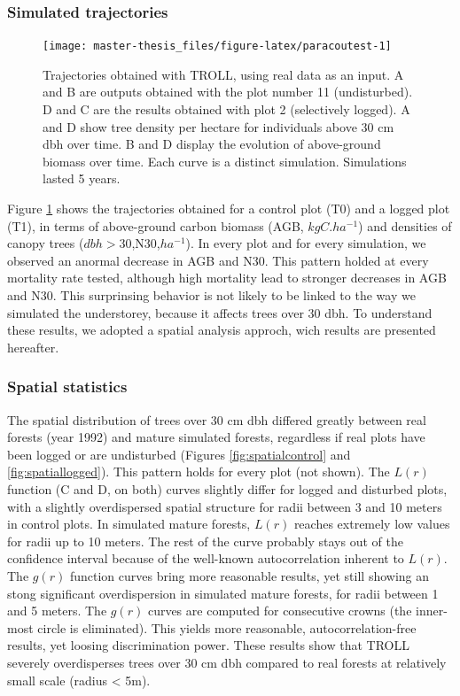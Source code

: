 \documentclass[12pt,]{article}
\theoremstyle{definition}
\theoremstyle{definition}
\theoremstyle{definition}
\theoremstyle{remark}
\begin{document}
\subsubsection{Simulated trajectories}\label{simulated-trajectories}

\begin{figure}
\texttt{[image: master-thesis\_files/figure-latex/paracoutest-1]} \caption{Trajectories obtained with TROLL, using real data as an input. A and B are outputs obtained with the plot number 11 (undisturbed). D and C are the results obtained with plot 2 (selectively logged). A and D show tree density per hectare for individuals above 30 cm dbh over time. B and D display the evolution of above-ground biomass over time. Each curve is a distinct simulation. Simulations lasted 5 years. }\label{fig:paracoutest}
\end{figure}

Figure \ref{fig:paracoutest} shows the trajectories obtained for a
control plot (T0) and a logged plot (T1), in terms of above-ground
carbon biomass (AGB, \(kgC.ha^{-1}\)) and densities of canopy trees
(\(dbh > 30\),N30,\(ha^{-1}\)). In every plot and for every simulation,
we observed an anormal decrease in AGB and N30. This pattern holded at
every mortality rate tested, although high mortality lead to stronger
decreases in AGB and N30. This surprinsing behavior is not likely to be
linked to the way we simulated the understorey, because it affects trees
over 30 dbh. To understand these results, we adopted a spatial analysis
approch, wich results are presented hereafter.

\subsubsection{Spatial statistics}\label{spatial-statistics}

The spatial distribution of trees over 30 cm dbh differed greatly
between real forests (year 1992) and mature simulated forests,
regardless if real plots have been logged or are undisturbed (Figures
\ref{fig:spatialcontrol} and \ref{fig:spatiallogged}). This pattern
holds for every plot (not shown). The \(L(r)\) function (C and D, on
both) curves slightly differ for logged and disturbed plots, with a
slightly overdispersed spatial structure for radii between 3 and 10
meters in control plots. In simulated mature forests, \(L(r)\) reaches
extremely low values for radii up to 10 meters. The rest of the curve
probably stays out of the confidence interval because of the well-known
autocorrelation inherent to \(L(r)\). The \(g(r)\) function curves bring
more reasonable results, yet still showing an stong significant
overdispersion in simulated mature forests, for radii between 1 and 5
meters. The \(g(r)\) curves are computed for consecutive crowns (the
inner-most circle is eliminated). This yields more reasonable,
autocorrelation-free results, yet loosing discrimination power. These
results show that TROLL severely overdisperses trees over 30 cm dbh
compared to real forests at relatively small scale (radius \textless{}
5m).
\end{document}
